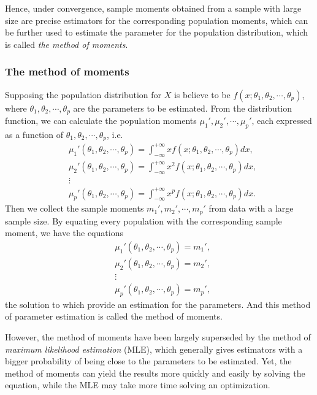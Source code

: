 Hence, under convergence, sample moments obtained from a sample with large size are precise estimators for the corresponding population moments, which can be further used to estimate the parameter for the population distribution, which is called \textit{the method of moments}. 

\subsubsection{The method of moments}

Supposing the population distribution  for $ X $ is believe to be $ f(x; \theta_1, \theta_2, \cdots, \theta_p) $, where $ \theta_1, \theta_2, \cdots, \theta_p $ are the parameters to be estimated. From the distribution function, we can calculate the population moments $ \mu_1', \mu_2', \cdots, \mu_p' $, each expressed as a function of $ \theta_1, \theta_2, \cdots, \theta_p $, i.e.
\begin{equation}
\begin{split}
&\mu_1'(\theta_1, \theta_2, \cdots, \theta_p) = \int_{-\infty}^{+\infty} x f(x; \theta_1, \theta_2, \cdots, \theta_p) dx, \\
&\mu_2'(\theta_1, \theta_2, \cdots, \theta_p) = \int_{-\infty}^{+\infty} x^2 f(x; \theta_1, \theta_2, \cdots, \theta_p) dx, \\
&\vdots \\
&\mu_p'(\theta_1, \theta_2, \cdots, \theta_p) = \int_{-\infty}^{+\infty} x^p f(x; \theta_1, \theta_2, \cdots, \theta_p) dx.
\end{split}
\end{equation}
Then we collect the sample moments $ m_1', m_2', \cdots, m_p' $ from data with a large sample size. By equating every population with the corresponding sample moment, we have the equations
\begin{equation}
\begin{split}
&\mu_1'(\theta_1, \theta_2, \cdots, \theta_p) = m_1',\\
&\mu_2'(\theta_1, \theta_2, \cdots, \theta_p) = m_2', \\
&\vdots \\
&\mu_p'(\theta_1, \theta_2, \cdots, \theta_p) = m_p',
\end{split}
\end{equation}
the solution to which provide an estimation for the parameters. And this method of parameter estimation is called the method of moments.

However, the method of moments have been largely superseded by the method of \textit{maximum likelihood estimation} (MLE), which generally gives estimators with a  bigger probability of being close to the parameters to be estimated. Yet, the method of moments can yield the results more quickly and easily by solving the equation, while the MLE may take more time solving an optimization. 

